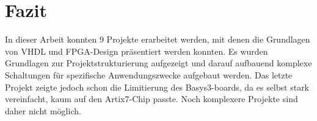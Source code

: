 \documentclass{article}
\begin{document}
\section{Fazit}
In dieser Arbeit konnten 9 Projekte erarbeitet werden, mit denen die Grundlagen von VHDL und FPGA-Design pr\"asentiert werden konnten. Es wurden Grundlagen zur Projektstrukturierung aufgezeigt und darauf aufbauend komplexe Schaltungen f\"ur spezifische Anwendungszwecke aufgebaut werden. Das letzte Projekt zeigte jedoch schon die Limitierung des Basys3-boards, da es selbst stark vereinfacht, kaum auf den Artix7-Chip passte. Noch komplexere Projekte sind daher nicht m\"oglich. 

\renewcommand\refname{Literatur}

\end{document}
